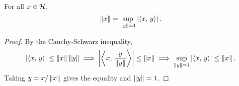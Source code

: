 \begin{proposition}
    For all $x\in\H$, 
    \begin{equation*}
        \norm{x} = \sup_{\norm{y} = 1}\abs{\inp{x}{y}}.
    \end{equation*}
\end{proposition}
\begin{proof}
    By the Cauchy-Schwarz inequality, 
    \begin{equation*}
        \abs{\inp{x}{y}} \leq \norm{x}\norm{y} 
        \implies \abs{\inp{x}{\frac{y}{\norm{y}}}} \leq \norm{x}
        \implies \sup_{\norm{y} = 1}\abs{\inp{x}{y}} \leq \norm{x}.
    \end{equation*}
    Taking $y = x/\norm{x}$ gives the equality and $\norm{y} = 1$.
\end{proof}

